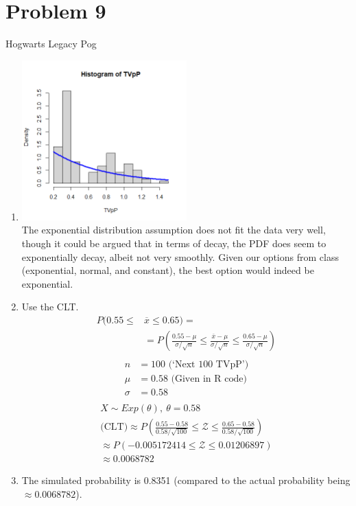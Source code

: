 \documentclass{article}
\begin{document}
\section*{Problem 9}
Hogwarts Legacy Pog
\begin{enumerate}[label=\alph*)]
    \item \includegraphics[width=0.5\textwidth]{hogwarts.png} \\
          The exponential distribution assumption does not fit the data very well, though it could be argued that in terms of decay, the PDF does seem to exponentially decay, albeit not very smoothly.
          Given our options from class (exponential, normal, and constant), the best option would indeed be exponential.
    \item Use the CLT.
          \begin{align*}
              P(0.55 \leq & \overline{x}  \leq 0.65) =                                                                                                      \\
                          & = P(\frac{0.55 - \mu}{\sigma/\sqrt{n}} \leq \frac{\overline{x} - \mu}{\sigma/\sqrt{n}} \leq \frac{0.65 - \mu}{\sigma/\sqrt{n}}) \\
          \end{align*}
          \begin{align*}
              n      & = 100 \text{ (`Next 100 TVpP')}  \\
              \mu    & = 0.58 \text{ (Given in R code)} \\
              \sigma & = 0.58                           \\
          \end{align*}
          \begin{align*}
              X \sim Exp(\theta),\ \theta = 0.58                                                                                    \\
              \text{(CLT)} \approx P(\frac{0.55 - 0.58}{0.58/\sqrt{100}} \leq \mathcal{Z} \leq \frac{0.65 - 0.58}{0.58/\sqrt{100}}) \\
              \approx P(-0.005172414 \leq \mathcal{Z} \leq 0.01206897)                                                              \\
              \approx 0.0068782
          \end{align*}
    \item The simulated probability is 0.8351 (compared to the actual probability being \(\approx 0.0068782\)).
\end{enumerate}
\end{document}
